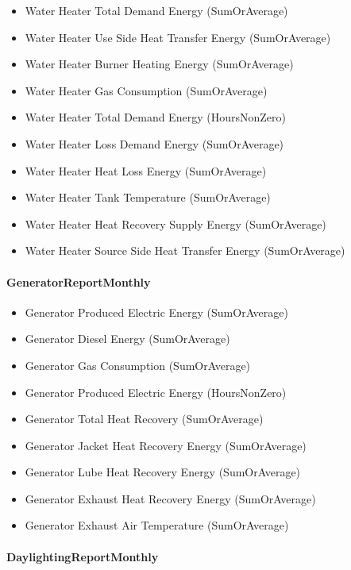 \begin{itemize}
\item
  Water Heater Total Demand Energy (SumOrAverage)
\item
  Water Heater Use Side Heat Transfer Energy (SumOrAverage)
\item
  Water Heater Burner Heating Energy (SumOrAverage)
\item
  Water Heater Gas Consumption (SumOrAverage)
\item
  Water Heater Total Demand Energy (HoursNonZero)
\item
  Water Heater Loss Demand Energy (SumOrAverage)
\item
  Water Heater Heat Loss Energy (SumOrAverage)
\item
  Water Heater Tank Temperature (SumOrAverage)
\item
  Water Heater Heat Recovery Supply Energy (SumOrAverage)
\item
  Water Heater Source Side Heat Transfer Energy (SumOrAverage)
\end{itemize}

\paragraph{GeneratorReportMonthly}\label{generatorreportmonthly}

\begin{itemize}
\item
  Generator Produced Electric Energy (SumOrAverage)
\item
  Generator Diesel Energy (SumOrAverage)
\item
  Generator Gas Consumption (SumOrAverage)
\item
  Generator Produced Electric Energy (HoursNonZero)
\item
  Generator Total Heat Recovery (SumOrAverage)
\item
  Generator Jacket Heat Recovery Energy (SumOrAverage)
\item
  Generator Lube Heat Recovery Energy (SumOrAverage)
\item
  Generator Exhaust Heat Recovery Energy (SumOrAverage)
\item
  Generator Exhaust Air Temperature (SumOrAverage)
\end{itemize}

\paragraph{DaylightingReportMonthly}\label{daylightingreportmonthly}

